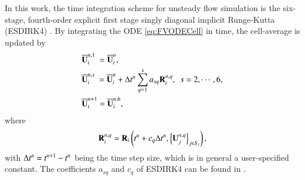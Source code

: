 {In this work, the time integration scheme for unsteady flow simulation is the six-stage, fourth-order explicit first stage singly diagonal implicit Runge-Kutta (ESDIRK4) \cite{bijl2002implicitBDFvESDIRK}. By integrating the ODE \eqref{eq:FVODECell} in time, the cell-average is updated by
\begin{subequations}\label{eq:ESDIRK4}
    \begin{align}
         & \overline{\mathbf{U}}^{n,1}_i \ = \overline{\mathbf{U}}^{n}_i, \label{eq:esdirk4-1}                                                                  \\
         & \overline{\mathbf{U}}^{n,s}_i \ = \overline{\mathbf{U}}^{n}_i + \mathrm\Delta t^n \sum_{q=1}^{s} a_{sq} \mathbf{R}_i^{n,q},\ \ s = 2, \cdots, 6, \label{eq:esdirk4-s} \\
         & \overline{\mathbf{U}}^{n+1}_i = \overline{\mathbf{U}}^{n,6}_i, \label{eq:esdirk4-6}
    \end{align}
\end{subequations}
where
\begin{equation}
    \mathbf{R}^{n,q}_i  = \mathbf{R}_i \left(t^n + c_q \mathrm\Delta t^n, \left\{\mathbf{U}^{n,q}_j\right\}_{j \in S_i}\right),
\end{equation}
with $\mathrm\Delta t^n= t^{n+1} - t^n$ being the time step size, which is in general a user-specified constant.
The coefficients $a_{sq}$ and $c_q$ of ESDIRK4 can be found
in \cite{bijl2002implicitBDFvESDIRK}.}

